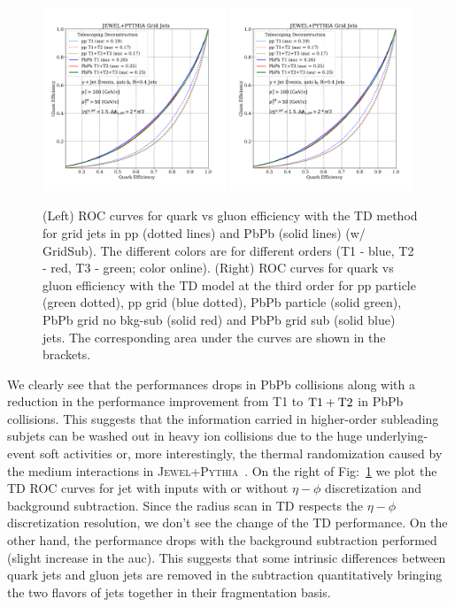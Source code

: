\documentclass[notoc]{JHEP3}
\newcommand{\jwpy}{\textsc{Jewel+Pythia}~}
\begin{document}
\begin{figure}[h]
	\centering
        \includegraphics[width=0.49\textwidth]{plots/JEWELPYTHIA_TD_2p76TeV_ppvsPbPb.pdf}
        \includegraphics[width=0.49\textwidth]{plots/JEWELPYTHIA_TD_2p76TeV_ppvsPbPb.pdf}
	\caption{(Left) ROC curves for quark vs gluon efficiency with the TD method for grid jets in pp (dotted lines) and PbPb (solid lines) (w/ GridSub). The different colors are for different orders (T1 - blue, T2 - red, T3 - green; color online). (Right) ROC curves for quark vs gluon efficiency with the TD model at the third order for pp particle (green dotted), pp grid (blue dotted), PbPb particle (solid green), PbPb grid no bkg-sub (solid red) and PbPb grid sub (solid blue) jets. The corresponding area under the curves are shown in the brackets.}
	\label{fig:ROC_TD_grid}
\end{figure}

We clearly see that the performances drops in PbPb collisions along with a reduction in the performance improvement from T1 to $\rm T1+T2$ in PbPb collisions. This suggests that the information carried in higher-order subleading subjets can be washed out in heavy ion collisions due to the huge underlying-event soft activities or, more interestingly, the thermal randomization caused by the medium interactions in \jwpy. On the right of Fig:~\ref{fig:ROC_TD_grid} we plot the TD ROC curves for jet with inputs with or without $\eta-\phi$ discretization and background subtraction. Since the radius scan in TD respects the $\eta-\phi$ discretization resolution, we don't see the change of the TD performance. On the other hand, the performance drops with the background subtraction performed (slight increase in the auc). This suggests that some intrinsic differences between quark jets and gluon jets are removed in the subtraction quantitatively bringing the two flavors of jets together in their fragmentation basis. 
\end{document}
